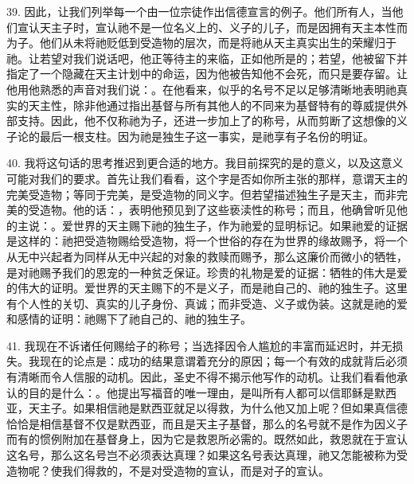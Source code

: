 39. 因此，让我们列举每一个由一位宗徒作出信德宣言的例子。他们所有人，当他们宣认天主子时，宣认祂不是一位名义上的、义子的儿子，而是因拥有天主本性而为子。他们从未将祂贬低到受造物的层次，而是将祂从天主真实出生的荣耀归于祂。让若望对我们说话吧，他正等待主的来临，正如他所是的；若望，他被留下并指定了一个隐藏在天主计划中的命运，因为他被告知他不会死，而只是要存留。让他用他熟悉的声音对我们说：。在他看来，似乎的名号不足以足够清晰地表明祂真实的天主性，除非他通过指出基督与所有其他人的不同来为基督特有的尊威提供外部支持。因此，他不仅称祂为子，还进一步加上了的称号，从而剪断了这想像的义子论的最后一根支柱。因为祂是独生子这一事实，是祂享有子名份的明证。\par

40. 我将这句话的思考推迟到更合适的地方。我目前探究的是的意义，以及这意义可能对我们的要求。首先让我们看看，这个字是否如你所主张的那样，意谓天主的完美受造物；等同于完美，是受造物的同义字。但若望描述独生子是天主，而非完美的受造物。他的话：，表明他预见到了这些亵渎性的称号；而且，他确曾听见他的主说：。爱世界的天主赐下祂的独生子，作为祂爱的显明标记。如果祂爱的证据是这样的：祂把受造物赐给受造物，将一个世俗的存在为世界的缘故赐予，将一个从无中兴起者为同样从无中兴起的对象的救赎而赐予，那么这廉价而微小的牺牲，是对祂赐予我们的恩宠的一种贫乏保证。珍贵的礼物是爱的证据：牺牲的伟大是爱的伟大的证明。爱世界的天主赐下的不是义子，而是祂自己的、祂的独生子。这里有个人性的关切、真实的儿子身份、真诚；而非受造、义子或伪装。这就是祂的爱和感情的证明：祂赐下了祂自己的、祂的独生子。\par

41. 我现在不诉诸任何赐给子的称号；当选择因令人尴尬的丰富而延迟时，并无损失。我现在的论点是：成功的结果意谓着充分的原因；每一个有效的成就背后必须有清晰而令人信服的动机。因此，圣史不得不揭示他写作的动机。让我们看看他承认的目的是什么：。他提出写福音的唯一理由，是叫所有人都可以信耶稣是默西亚，天主子。如果相信祂是默西亚就足以得救，为什么他又加上呢？但如果真信德恰恰是相信基督不仅是默西亚，而且是天主子基督，那么的名号就不是作为因义子而有的惯例附加在基督身上，因为它是救恩所必需的。既然如此，救恩就在于宣认这名号，那么这名号岂不必须表达真理？如果这名号表达真理，祂又怎能被称为受造物呢？使我们得救的，不是对受造物的宣认，而是对子的宣认。\par

